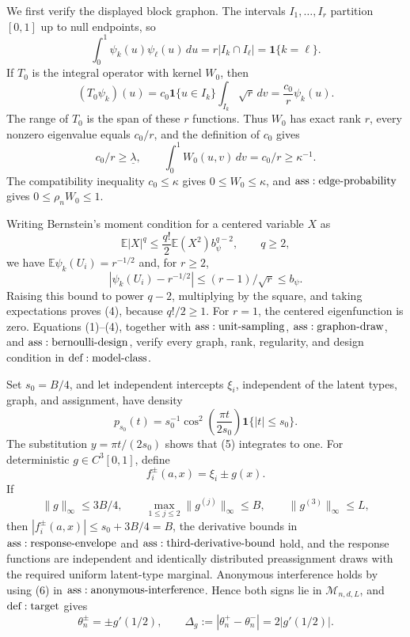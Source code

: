 We first verify the displayed block graphon.  The intervals \(I_1,\ldots,I_r\) partition \([0,1]\) up to null endpoints, so
\[
 \int_0^1\psi_k(u)\psi_\ell(u)\,du
 =r|I_k\cap I_\ell|=\mathbf1\{k=\ell\}.
\tag{1}
\]
If \(T_0\) is the integral operator with kernel \(W_0\), then
\[
 (T_0\psi_k)(u)
 =c_0\mathbf1\{u\in I_k\}\int_{I_k}\sqrt r\,dv
 =\frac{c_0}{r}\psi_k(u).
\tag{2}
\]
The range of \(T_0\) is the span of these \(r\) functions.  Thus \(W_0\) has exact rank \(r\), every nonzero eigenvalue equals \(c_0/r\), and the definition of \(c_0\) gives
\[
 c_0/r\geq\underline\lambda,
 \qquad \int_0^1W_0(u,v)\,dv=c_0/r\geq\kappa^{-1}.
\tag{3}
\]
The compatibility inequality \(c_0\leq\kappa\) gives \(0\leq W_0\leq\kappa\), and \({\rm ass:edge\text{-}probability}\) gives \(0\leq\rho_nW_0\leq1\).

Writing Bernstein's moment condition for a centered variable \(X\) as
\[
 \mathbb E|X|^q\leq\frac{q!}{2}\mathbb E(X^2)b_\psi^{q-2},
 \qquad q\geq2,
\tag{4}
\]
we have \(\mathbb E\psi_k(U_i)=r^{-1/2}\) and, for \(r\geq2\),
\[
 |\psi_k(U_i)-r^{-1/2}|\leq(r-1)/\sqrt r\leq b_\psi.
\]
Raising this bound to power \(q-2\), multiplying by the square, and taking expectations proves (4), because \(q!/2\geq1\).  For \(r=1\), the centered eigenfunction is zero.  Equations (1)--(4), together with \({\rm ass:unit\text{-}sampling}\), \({\rm ass:graphon\text{-}draw}\), and \({\rm ass:bernoulli\text{-}design}\), verify every graph, rank, regularity, and design condition in \({\rm def:model\text{-}class}\).

Set \(s_0=B/4\), and let independent intercepts \(\xi_i\), independent of the latent types, graph, and assignment, have density
\[
 p_{s_0}(t)=s_0^{-1}\cos^2\!\left(\frac{\pi t}{2s_0}\right)
 \mathbf1\{|t|\leq s_0\}.
\tag{5}
\]
The substitution \(y=\pi t/(2s_0)\) shows that (5) integrates to one.  For deterministic \(g\in C^3[0,1]\), define
\[
 f_i^\pm(a,x)=\xi_i\pm g(x).
\tag{6}
\]
If
\[
 \|g\|_\infty\leq3B/4,
 \qquad \max_{1\leq j\leq2}\|g^{(j)}\|_\infty\leq B,
 \qquad \|g^{(3)}\|_\infty\leq L,
\tag{7}
\]
then \(|f_i^\pm(a,x)|\leq s_0+3B/4=B\), the derivative bounds in \({\rm ass:response\text{-}envelope}\) and \({\rm ass:third\text{-}derivative\text{-}bound}\) hold, and the response functions are independent and identically distributed preassignment draws with the required uniform latent-type marginal.  Anonymous interference holds by using (6) in \({\rm ass:anonymous\text{-}interference}\).  Hence both signs lie in \(\mathcal M_{n,d,L}\), and \({\rm def:target}\) gives
\[
 \theta_n^\pm=\pm g'(1/2),
 \qquad \Delta_g:=|\theta_n^+-\theta_n^-|=2|g'(1/2)|.
\tag{8}
\]

